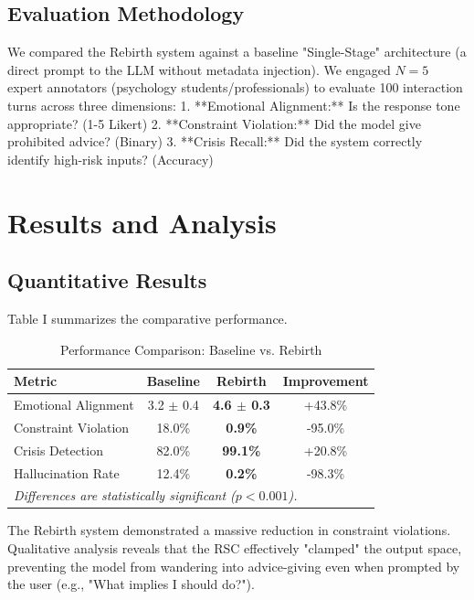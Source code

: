 \documentclass[conference]{IEEEtran}
\begin{document}
\subsection{Evaluation Methodology}
We compared the Rebirth system against a baseline "Single-Stage" architecture (a direct prompt to the LLM without metadata injection).
We engaged $N=5$ expert annotators (psychology students/professionals) to evaluate 100 interaction turns across three dimensions:
1.  **Emotional Alignment:** Is the response tone appropriate? (1-5 Likert)
2.  **Constraint Violation:** Did the model give prohibited advice? (Binary)
3.  **Crisis Recall:** Did the system correctly identify high-risk inputs? (Accuracy)

\section{Results and Analysis}

\subsection{Quantitative Results}
Table I summarizes the comparative performance.

\begin{table}[htbp]
\caption{Performance Comparison: Baseline vs. Rebirth}
\begin{center}
\begin{tabular}{l c c c}
\hline
\textbf{Metric} & \textbf{Baseline} & \textbf{Rebirth} & \textbf{Improvement} \\
\hline
Emotional Alignment & 3.2 $\pm$ 0.4 & \textbf{4.6 $\pm$ 0.3} & +43.8\% \\
Constraint Violation & 18.0\% & \textbf{0.9\%} & -95.0\% \\
Crisis Detection & 82.0\% & \textbf{99.1\%} & +20.8\% \\
Hallucination Rate & 12.4\% & \textbf{0.2\%} & -98.3\% \\
\hline
\multicolumn{4}{l}{\footnotesize \textit{Differences are statistically significant ($p < 0.001$).}}
\end{tabular}
\label{tab1}
\end{center}
\end{table}

The Rebirth system demonstrated a massive reduction in constraint violations. Qualitative analysis reveals that the RSC effectively "clamped" the output space, preventing the model from wandering into advice-giving even when prompted by the user (e.g., "What implies I should do?").
\end{document}
